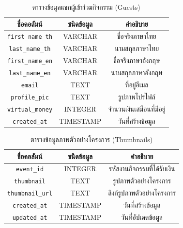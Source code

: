 \begin{table}[hb]
    \centering
    \begin{tabular}{|c|c|c|}
        \hline
        ชื่อคอลัมน์               & ชนิดข้อมูล   & คำอธิบาย           \\ \hline
        \verb |first_name_th| & VARCHAR   & ชื่อจริงภาษาไทย     \\ \hline
        \verb |last_name_th|  & VARCHAR   & นามสกุลภาษาไทย    \\ \hline
        \verb |first_name_en| & VARCHAR   & ชื่อจริงภาษาอังกฤษ   \\ \hline
        \verb |last_name_en|  & VARCHAR   & นามสกุลภาษาอังกฤษ  \\ \hline
        \verb |email|         & TEXT      & ที่อยู่อีเมล          \\ \hline
        \verb |profile_pic|   & TEXT      & รูปภาพโปรไฟล์      \\ \hline
        \verb |virtual_money| & INTEGER   & จำนวนเงินเสมือนที่มีอยู่ \\ \hline
        \verb |created_at|    & TIMESTAMP & วันที่สร้างข้อมูล      \\ \hline
    \end{tabular}
    \caption{ตารางข้อมูลแขกผู้เข้าร่วมกิจกรรม (Guests)}
    \label{tab:guest_data}
\end{table}

\begin{table}[ht]
    \centering
    \begin{tabular}{|c|c|c|}
        \hline
        ชื่อคอลัมน์               & ชนิดข้อมูล   & คำอธิบาย                \\ \hline
        \verb |event_id|      & INTEGER   & รหัสงานกิจกรรมที่ได้รับเงิน  \\ \hline
        \verb |thumbnail|     & TEXT      & รูปภาพตัวอย่างโครงการ    \\ \hline
        \verb |thumbnail_url| & TEXT      & ลิงก์รูปภาพตัวอย่างโครงการ \\ \hline
        \verb |created_at|    & TIMESTAMP & วันที่สร้างข้อมูล           \\ \hline
        \verb |updated_at|    & TIMESTAMP & วันที่อัปเดตข้อมูล          \\ \hline
    \end{tabular}
    \caption{ตารางข้อมูลภาพตัวอย่างโครงการ (Thumbnails)}
    \label{tab:thumbnail_data}
\end{table}

